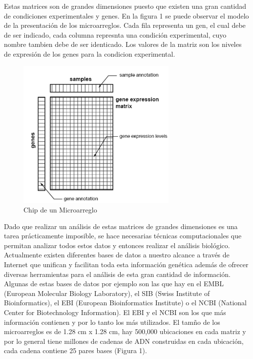 \documentclass[12pt,letterpaper]{article}
\begin{document}
Estas matrices son de grandes dimensiones puesto que existen una gran cantidad de condiciones experimentales y genes. En la figura 1 se puede observar el modelo de la presentación de los microarreglos. Cada fila representa un gen, el cual debe de ser indicado, cada columna represnta una condición experimental, cuyo nombre tambien debe de ser identicado. Los valores de la matriz son los niveles de expresión de los genes para la condicion experimental.
\begin{figure}[H]
\begin{center}
\includegraphics[width=0.7\textwidth]{matrix.png}
\end{center}
\caption{Chip de un Microarreglo}
\end{figure}
Dado que realizar un análisis de estas matrices de grandes dimensiones es una tarea prácticamente imposible, se hace necesarias técnicas computacionales que permitan analizar todos estos datos y entonces realizar el análisis biológico.\\
Actualmente existen diferentes bases de datos a nuestro alcance a través de Internet que unifican y facilitan toda esta información genética además de ofrecer diversas herramientas para el análisis de esta gran cantidad de información. Algunas de estas bases de datos por ejemplo son las que hay en el EMBL (European Molecular Biology Laboratory), el SIB (Swiss Institute of Bioinformatics), el EBI (European Bioinformatics Institute) o el NCBI (National Center for Biotechnology Information). El EBI y el NCBI son los que más información contienen y por lo tanto los más utilizados.
El tamño de los microarreglos es de 1.28 cm x 1.28 cm, hay 500,000 ubicaciones en cada matriz y por lo general tiene millones de cadenas de ADN construidas en cada ubicación, cada cadena contiene 25 pares bases (Figura 1).
\end{document}
